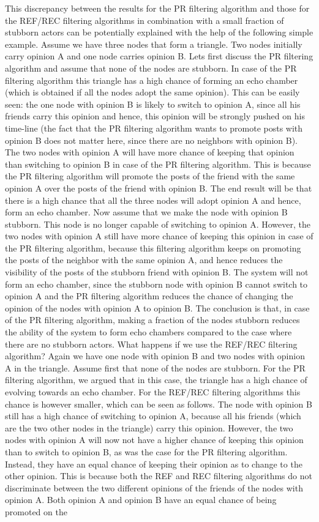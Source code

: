 \documentclass[11 pt , letterpaper , twoside , openright]{book}
\begin{document}
This discrepancy between the results for the PR filtering algorithm and those for the REF/REC filtering algorithms in combination with a small fraction of stubborn actors can be potentially explained with the help of the following simple example. Assume we have three nodes that form a triangle. Two nodes initially carry opinion A and one node carries opinion B. Lets first discuss the PR filtering algorithm and assume that none of the nodes are stubborn. In case of the PR filtering algorithm this triangle has a high chance of forming an echo chamber (which is obtained if all the nodes adopt the same opinion). This can be easily seen: the one node with opinion B is likely to switch to opinion A, since all his friends carry this opinion and hence, this opinion will be strongly pushed on his time-line (the fact that the PR filtering algorithm wants to promote posts with opinion B does not matter here, since there are no neighbors with opinion B). The two nodes with opinion A will have more chance of keeping that opinion than switching to opinion B in case of the PR filtering algorithm. This is because the PR filtering algorithm will promote the posts of the friend with the same opinion A over the posts of the friend with opinion B. The end result will be that there is a high chance that all the three nodes will adopt opinion A and hence, form an echo chamber. Now assume that we make the node with opinion B stubborn. This node is no longer capable of switching to opinion A. However, the two nodes with opinion A still have more chance of keeping this opinion in case of the PR filtering algorithm, because this filtering algorithm keeps on promoting the posts of the neighbor with the same opinion A, and hence reduces the visibility of the posts of the stubborn friend with opinion B. The system will not form an echo chamber, since the stubborn node with opinion B cannot switch to opinion A and the PR filtering algorithm reduces the chance of changing the opinion of the nodes with opinion A to opinion B. The conclusion is that, in case of the PR filtering algorithm, making a fraction of the nodes stubborn reduces the ability of the system to form echo chambers compared to the case where there are no stubborn actors. What happens if we use the REF/REC filtering algorithm? Again we have one node with opinion B and two nodes with opinion A in the triangle. Assume first that none of the nodes are stubborn. For the PR filtering algorithm, we argued that in this case, the triangle has a high chance of evolving towards an echo chamber. For the REF/REC filtering algorithms this chance is however smaller, which can be seen as follows. The node with opinion B still has a high chance of switching to opinion A, because all his friends (which are the two other nodes in the triangle) carry this opinion. However, the two nodes with opinion A will now not have a higher chance of keeping this opinion than to switch to opinion B, as was the case for the PR filtering algorithm. Instead, they have an equal chance of keeping their opinion as to change to the other opinion. This is because both the REF and REC filtering algorithms do not discriminate between the two different opinions of the friends of the nodes with opinion A. Both opinion A and opinion B have an equal chance of being promoted on the 
\end{document}
